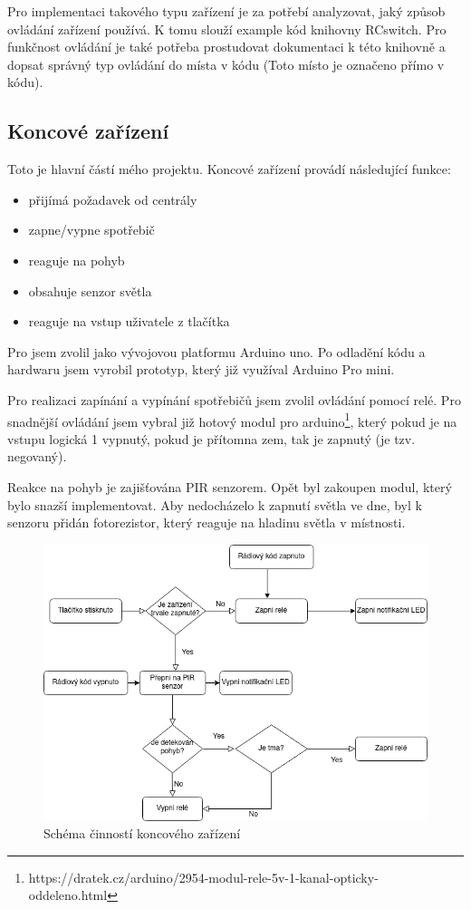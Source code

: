 \documentclass[11pt,a4paper,twoside,openright]{report}
\begin{document}
Pro implementaci takového typu zařízení je za potřebí analyzovat, jaký způsob ovládání zařízení používá. K tomu slouží example kód knihovny RCswitch. Pro funkčnost ovládání je také potřeba prostudovat dokumentaci k této knihovně a dopsat správný typ ovládání do místa v kódu (Toto místo je označeno přímo v kódu).

\subsection{Koncové zařízení}

Toto je hlavní částí mého projektu. Koncové zařízení provádí následující funkce:

\begin{itemize}
	\item přijímá požadavek od centrály
	\item zapne/vypne spotřebič
	\item reaguje na pohyb
	\item obsahuje senzor světla 
	\item reaguje na vstup uživatele z tlačítka
\end{itemize}

Pro  jsem zvolil jako vývojovou platformu Arduino uno. Po odladění kódu a hardwaru jsem vyrobil prototyp, který již využíval Arduino Pro mini. 


Pro realizaci zapínání a vypínání spotřebičů jsem zvolil ovládání pomocí relé. Pro snadnější ovládání jsem vybral již hotový modul pro arduino\footnote{https://dratek.cz/arduino/2954-modul-rele-5v-1-kanal-opticky-oddeleno.html}, který pokud je na vstupu logická 1 vypnutý, pokud je přítomna zem, tak je zapnutý (je tzv. negovaný).


Reakce na pohyb je zajišťována PIR senzorem. Opět byl zakoupen modul, který bylo snazší implementovat. Aby nedocházelo k zapnutí světla ve dne, byl k senzoru přidán fotorezistor, který reaguje na hladinu světla v místnosti.

\begin{figure}[htb]
\centering
\includegraphics[width=1\hsize]{img/schema_koncove_zarizeni.png}
\caption{Schéma činností koncového zařízení}\end{figure}
\end{document}

